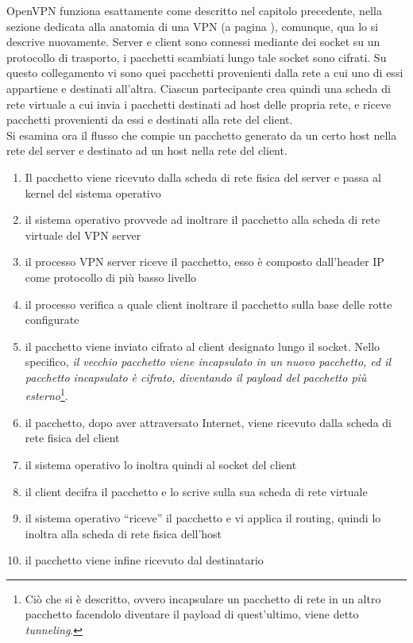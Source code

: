 OpenVPN funziona esattamente come descritto nel capitolo precedente, nella sezione
dedicata alla anatomia di una VPN (a pagina
\pageref{sec:vpn-anatomy}), comunque, qua lo si descrive nuovamente. Server e client
sono connessi mediante dei socket su un protocollo di trasporto, i pacchetti scambiati
lungo tale socket sono cifrati.
Su questo collegamento vi sono quei pacchetti provenienti dalla rete a cui uno di essi
appartiene e destinati all'altra. Ciascun partecipante crea quindi una scheda di rete
virtuale a cui invia i pacchetti destinati ad host delle propria rete, e riceve
pacchetti provenienti da essi e destinati alla rete del client.\\
Si esamina ora il flusso che compie un pacchetto generato da un certo host nella rete
del server e destinato ad un host nella rete del client.
\begin{enumerate}
  \item Il pacchetto viene ricevuto dalla scheda di rete fisica del server e passa
  al kernel del sistema operativo
  \item il sistema operativo provvede ad inoltrare il pacchetto alla scheda di rete
  virtuale del VPN server
  \item il processo VPN server riceve il pacchetto, esso è composto dall'header IP come
  protocollo di più basso livello
  \item il processo verifica a quale client inoltrare il pacchetto sulla base delle rotte
  configurate
  \item il pacchetto viene inviato cifrato al client designato lungo il socket. Nello
  specifico, \textit{il vecchio pacchetto viene incapsulato in un nuovo pacchetto,
  ed il pacchetto incapsulato è cifrato, diventando il payload del pacchetto
  più esterno}\footnote{Ciò che si è descritto, ovvero incapsulare un pacchetto di rete
  in un altro pacchetto facendolo diventare il payload di quest'ultimo, viene detto
  \textit{tunneling}.}.
  \item il pacchetto, dopo aver attraversato Internet, viene ricevuto dalla scheda di rete
  fisica del client
  \item il sistema operativo lo inoltra quindi al socket del client
  \item il client decifra il pacchetto e lo scrive sulla sua scheda di rete virtuale
  \item il sistema operativo ``riceve'' il pacchetto e vi applica il routing, quindi
  lo inoltra alla scheda di rete fisica dell'host
  \item il pacchetto viene infine ricevuto dal destinatario
\end{enumerate}
